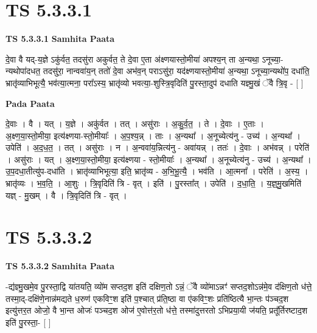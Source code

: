 \documentclass[17pt]{extarticle}
\begin{document}
\section{ TS 5.3.3.1 }

\textbf{TS 5.3.3.1 } \newline
\textbf{Samhita Paata} \newline

दे॒वा वै यद्-य॒ज्ञे ऽकु॑र्वत॒ तदसु॑रा अकुर्वत॒ ते दे॒वा ए॒ता अ॑क्ष्णयास्तो॒मीया॑ अपश्य॒न् ता अ॒न्यथा॒ ऽनूच्या॒-न्यथोपा॑दधत॒ तदसु॑रा॒ नान्ववा॑य॒न् ततो॑ दे॒वा अभ॑व॒न् पराऽसु॑रा॒ यद॑क्ष्णयास्तो॒मीया॑ अ॒न्यथा॒ ऽनूच्या॒न्यथो॑प॒ दधा॑ति॒ भ्रातृ॑व्याभिभूत्यै॒ भव॑त्या॒त्मना॒ परा᳚ऽस्य॒ भ्रातृ॑व्यो भवत्या॒-शुस्त्रि॒वृदिति॑ पु॒रस्ता॒दुप॑ दधाति यज्ञ्मु॒खं ॅवै त्रि॒वृ - [  ] \newline

\textbf{Pada Paata} \newline

दे॒वाः । वै । यत् । य॒ज्ञे । अकु॑र्वत । तत् । असु॑राः । अ॒कु॒र्व॒त॒ । ते । दे॒वाः । ए॒ताः । अ॒क्ष्ण॒या॒स्तो॒मीया॒ इत्य॑क्ष्णया-स्तो॒मीयाः᳚ । अ॒प॒श्य॒न्न् । ताः । अ॒न्यथा᳚ । अ॒नूच्येत्य॑नु - उच्य॑ । अ॒न्यथा᳚ । उपेति॑ । अ॒द॒ध॒त॒ । तत् । असु॑राः । न । अ॒न्ववा॑य॒न्नित्य॑नु - अवा॑यन्न् । ततः॑ । दे॒वाः । अभ॑वन्न् । परेति॑ । असु॑राः । यत् । अ॒क्ष्ण॒या॒स्तो॒मीया॒ इत्य॑क्ष्णया - स्तो॒मीयाः᳚ । अ॒न्यथा᳚ । अ॒नूच्येत्य॑नु - उच्य॑ । अ॒न्यथा᳚ । उ॒प॒दधा॒तीत्यु॑प-दधा॑ति । भ्रातृ॑व्याभिभूत्या॒ इति॒ भ्रातृ॑व्य - अ॒भि॒भू॒त्यै॒ । भव॑ति । आ॒त्मना᳚ । परेति॑ । अ॒स्य॒ । भ्रातृ॑व्यः । भ॒व॒ति॒ । आ॒शुः । त्रि॒वृदिति॑ त्रि - वृत् । इति॑ । पु॒रस्ता᳚त् । उपेति॑ । द॒धा॒ति॒ । य॒ज्ञ्॒मु॒खमिति॑ यज्ञ् - मु॒खम् । वै । त्रि॒वृदिति॑ त्रि - वृत् ।  \newline





\section{ TS 5.3.3.2 }

\textbf{TS 5.3.3.2 } \newline
\textbf{Samhita Paata} \newline

-द्य॑ज्ञ्मु॒खमे॒व पु॒रस्ता॒द्वि या॑तयति॒ व्यो॑म सप्तद॒श इति॑ दक्षिण॒तो ऽन्नं॒ ॅवै व्यो॑माऽन्नꣳ॑ सप्तद॒शोऽन्न॑मे॒व द॑क्षिण॒तो ध॑त्ते॒ तस्मा॒द्-दक्षि॑णे॒नान्न॑मद्यते ध॒रुण॑ एकविꣳ॒॒श इति॑ प॒श्चात् प्र॑ति॒ष्ठा वा ए॑कविꣳ॒॒शः प्रति॑ष्ठित्यै भा॒न्तः प॑ञ्चद॒श इत्यु॑त्तर॒त ओजो॒ वै भा॒न्त ओजः॑ पञ्चद॒श ओज॑ ए॒वोत्त॑र॒तो ध॑त्ते॒ तस्मा॑दुत्तरतो ऽभिप्रया॒यी ज॑यति॒ प्रतू᳚र्तिरष्टाद॒श इति॑ पु॒रस्ता॒- [  ] \newline
\end{document}
